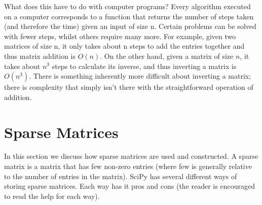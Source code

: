 What does this have to do with computer programs?  
Every algorithm executed on a computer corresponds to a function 
that returns the number of steps taken (and therefore the time) 
given an input of size n.  Certain problems can be solved with fewer steps,
whilst others require many more.  For example, given two matrices of size n,
it only takes about n steps to add the entries together and thus matrix addition is $O(n)$.  
On the other hand, given a matrix of size $n$, it takes about 
$n^3$ steps to calculate its inverse, 
and thus inverting a matrix is $O(n^3)$.
There is something inherently more difficult about inverting a matrix; 
there is complexity that simply isn't there with the straightforward operation of addition.

\section*{Sparse Matrices}
In this section we discuss how sparse matrices are used and constructed. 
A sparse matrix is a matrix that has few non-zero entries 
(where few is generally relative to the number of entries in the matrix).  
SciPy has several different ways of storing sparse matrices.  
Each way has it pros and cons (the reader is encouraged to read the help for each way).

